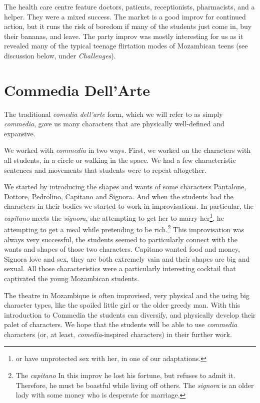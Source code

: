 \documentclass[article,twocolumn,twoside]{memoir}
\begin{document}
The health care centre feature doctors, patients, receptionists, pharmacists,
and a helper. They were a mixed success. The market is a good improv for
continued action, but it runs the risk of boredom if many of the students just
come in, buy their bananas, and leave. The party improv was mostly interesting
for us as it revealed many of the typical teenage flirtation modes of
Mozambican teens (see discussion below, under \emph{Challenges}).

\section{Commedia Dell'Arte}

The traditional \textit{comedia dell'arte} form, which we will refer to as
simply \textit{commedia}, gave us many characters that are physically
well-defined and expansive.

We worked with \textit{commedia} in two ways. First, we worked on the characters
with all students, in a circle or walking in the space. We had a few
characteristic sentences and movements that students were to repeat altogether.

We started by introducing the shapes and wants of some characters Pantalone, Dottore, Pedrolino, Capitano and Signora. And when the students  had the characters in their bodies we started to work in improvisations. In particular, the \textit{capitano} meets
the \textit{signora}, she attempting to get her to marry her\footnote{or have
unprotected sex with her, in one of our adaptations.}, he attempting to get a
meal while pretending to be rich.\footnote{The \textit{capitano} In this improv he lost his
fortune, but refuses to admit it. Therefore, he must be boastful while living
off others. The \textit{signora} is an older lady with some money who is
desperate for marriage.}
This improvisation was always very successful, the students seemed to particularly connect with the wants and shapes of those two characters. Capitano wanted food and money, Signora love and sex, they are both extremely vain and their shapes are big and sexual. All those characteristics were a particularly interesting cocktail that captivated the young Mozambican students. 
 
The theatre in Mozambique is often improvised, very physical and the using big character types, like the spoiled little girl or the older greedy man. With this introduction to Commedia the students can diversify, and physically develop their palet of characters.  
We hope that the students will be able to use \textit{commedia} characters (or,
at least, \textit{comedia}-inspired characters) in their further work.
\end{document}
